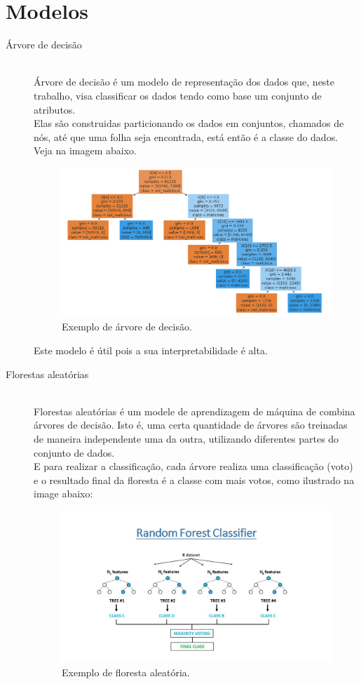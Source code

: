 \section{Modelos}


\begin{description}
    \item[Árvore de decisão] \hfill \\ Árvore de decisão é um modelo de representação dos dados que, neste trabalho, visa classificar os dados tendo como base um conjunto de atributos. \\ 
    Elas são construidas particionando os dados em conjuntos, chamados de nós, até que uma folha seja encontrada, está então é a classe do dados. Veja na imagem abaixo.
    
    \begin{figure}
        \centering
        \includegraphics[width=.6\textwidth]{figuras/ex_decicion_tree.png}
        \caption{Exemplo de árvore de decisão.\label{fig:ex_decision_tree}}    
    \end{figure}

    Este modelo é útil pois a sua interpretabilidade é alta.

    \item[Florestas aleatórias] \hfill \\ Florestas aleatórias é um modele de aprendizagem de máquina de combina árvores de decisão. Isto é, uma certa quantidade de árvores são treinadas de maneira independente uma da outra, utilizando diferentes partes do conjunto de dados. \\ 
    E para realizar a classificação, cada árvore realiza uma classificação (voto) e o resultado final da floresta é a classe com mais votos, como ilustrado na image abaixo:\\

    \begin{figure}
        \centering
        \includegraphics[width=.8\textwidth]{figuras/ex_random_forest.jpg}
        \caption{Exemplo de floresta aleatória.\label{fig:ex_random_forest}}    
    \end{figure}


\end{description}
